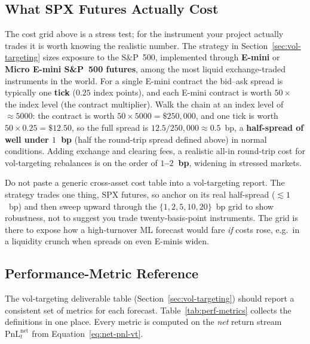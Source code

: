 \subsection{What SPX Futures Actually Cost}
\label{subsec:spx-costs}

The cost grid above is a stress test; for the instrument your project actually trades it is worth knowing the realistic number. The strategy in Section~\ref{sec:vol-targeting} sizes exposure to the S\&P~500, implemented through \textbf{E-mini} or \textbf{Micro E-mini S\&P~500 futures}, among the most liquid exchange-traded instruments in the world. For a single E-mini contract the bid--ask spread is typically one \textbf{tick} ($0.25$ index points), and each E-mini contract is worth $50 \times$ the index level (the contract multiplier). Walk the chain at an index level of $\approx 5000$: the contract is worth $50 \times 5000 = \$250{,}000$, and one tick is worth $50 \times 0.25 = \$12.50$, so the full spread is $12.5 / 250{,}000 \approx 0.5$~bp, a \textbf{half-spread of well under $1$~bp} (half the round-trip spread defined above) in normal conditions. Adding exchange and clearing fees, a realistic all-in round-trip cost for vol-targeting rebalances is on the order of \textbf{$1$--$2$~bp}, widening in stressed markets.

\begin{warning}
Do not paste a generic cross-asset cost table into a vol-targeting report. The strategy trades one thing, SPX futures, so anchor on its real half-spread ($\lesssim 1$~bp) and then sweep upward through the $\{1,2,5,10,20\}$~bp grid to show robustness, not to suggest you trade twenty-basis-point instruments. The grid is there to expose how a high-turnover ML forecast would fare \emph{if} costs rose, e.g.\ in a liquidity crunch when spreads on even E-minis widen.
\end{warning}

\subsection{Performance-Metric Reference}
\label{subsec:metric-reference}

The vol-targeting deliverable table (Section~\ref{sec:vol-targeting}) should report a consistent set of metrics for each forecast. Table~\ref{tab:perf-metrics} collects the definitions in one place. Every metric is computed on the \emph{net} return stream $\text{PnL}_t^{\text{net}}$ from Equation~\eqref{eq:net-pnl-vt}.

